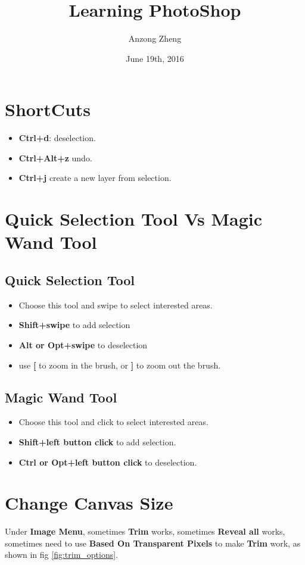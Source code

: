 \documentclass[10pt,a4paper]{article}
\begin{document}
\author{Anzong Zheng}
\title{Learning PhotoShop}
\date{June 19th, 2016}
\maketitle
\newpage

\section{ShortCuts}
\begin{itemize}
\item \textbf{Ctrl+d}: deselection.
\item \textbf{Ctrl+Alt+z} undo.
\item \textbf{Ctrl+j} create a new layer from selection.
\end{itemize}

\section{Quick Selection Tool Vs Magic Wand Tool}
\subsection{Quick Selection Tool}
\begin{itemize}
\item Choose this tool and swipe to select interested areas.
\item \textbf{Shift+swipe} to add selection
\item \textbf{Alt or Opt+swipe} to deselection
\item use \textbf{[} to zoom in the brush, or \textbf{]} to zoom out the brush.
\end{itemize}

\subsection{Magic Wand Tool}
\begin{itemize}
\item Choose this tool and click to select interested areas.
\item \textbf{Shift+left button click} to add selection.
\item \textbf{Ctrl or Opt+left button click} to deselection.
\end{itemize}

\section{Change Canvas Size}
Under \textbf{Image Menu}, sometimes \textbf{Trim} works, sometimes \textbf{Reveal all} works, sometimes need to use \textbf{Based On Transparent Pixels} to make \textbf{Trim} work, as shown in fig \ref{fig:trim_options}.
\end{document}
